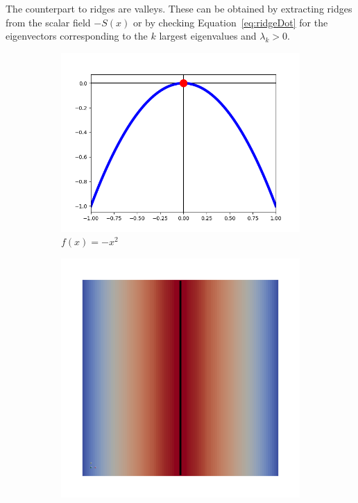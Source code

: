 \noindent The counterpart to ridges are valleys. These can be obtained
by extracting ridges from the scalar field $-S(x)$ or by checking
Equation~\ref{eq:ridgeDot} for the eigenvectors corresponding to the
$k$ largest eigenvalues and $\lambda_k > 0$.
\begin{figure}
  \begin{subfigure}[b]{0.33\textwidth}
    \includegraphics[width=\textwidth]{Images/func1D.png}
    \caption{$f(x)= -x^2$}
    \label{fig:ridge1D}
  \end{subfigure}
  \begin{subfigure}[b]{0.33\textwidth}
    \includegraphics[width=\textwidth]{Images/func2D.png}

\end{subfigure}
\end{figure}
